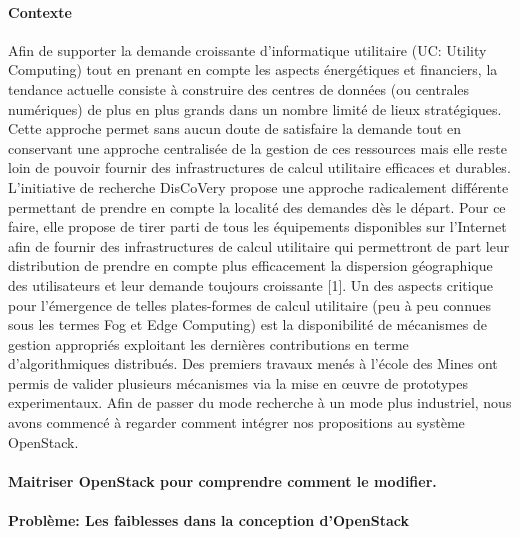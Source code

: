 \documentclass[a4paper,11pt]{article}
\newcommand{\discovery}{DisCoVery }
\begin{document}
\begin{note}
\paragraph*{Contexte\\}
Afin de supporter la demande croissante d'informatique utilitaire (UC:
Utility Computing) tout en prenant en compte les aspects énergétiques
et financiers, la tendance actuelle consiste à construire des centres
de données (ou centrales numériques) de plus en plus grands dans un
nombre limité de lieux stratégiques.  Cette approche permet sans aucun
doute de satisfaire la demande tout en conservant une approche
centralisée de la gestion de ces ressources mais elle reste loin de
pouvoir fournir des infrastructures de calcul utilitaire efficaces et
durables. L'initiative de recherche \discovery propose une approche
radicalement différente permettant de prendre en compte la localité
des demandes dès le départ. Pour ce faire, elle propose de tirer parti
de tous les équipements disponibles sur l'Internet afin de fournir des
infrastructures de calcul utilitaire qui permettront de part leur
distribution de prendre en compte plus efficacement la dispersion
géographique des utilisateurs et leur demande toujours croissante
[1]. Un des aspects critique pour l'émergence de telles plates-formes
de calcul utilitaire (peu à peu connues sous les termes Fog et Edge
Computing) est la disponibilité de mécanismes de gestion appropriés
exploitant les dernières contributions en terme d'algorithmiques
distribués.  Des premiers travaux menés à l'école des Mines ont permis
de valider plusieurs mécanismes via la mise en \oe uvre de prototypes
experimentaux. Afin de passer du mode recherche à un mode plus
industriel, nous avons commencé à regarder comment intégrer nos
propositions au système OpenStack.

\paragraph*{Maitriser OpenStack pour comprendre comment le modifier.\\}

\paragraph*{Problème: Les faiblesses dans la conception d'OpenStack\\}


\end{note}
\end{document}
